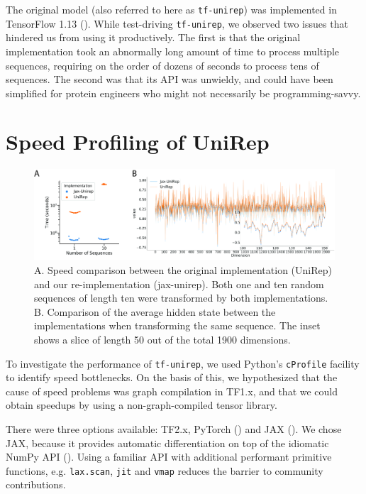 \documentclass{bioinfo}
\begin{document}
The original model (also referred to here as \verb|tf-unirep|)
was implemented in TensorFlow 1.13 (\cite{abadi2016tensorflow}).
While test-driving \verb|tf-unirep|, we observed two issues
that hindered us from using it productively.
The first is that the original implementation
took an abnormally long amount of time to process multiple sequences,
requiring on the order of dozens of seconds to process tens of sequences.
The second was that its API was unwieldy,
and could have been simplified for protein engineers
who might not necessarily be programming-savvy.

\section{Speed Profiling of UniRep}

\begin{figure}[!tpb]
    \centerline{\includegraphics[width=6in]{fig01.jpg}}
    \caption{
        A. Speed comparison between the original implementation (UniRep)
        and our re-implementation (jax-unirep).
        Both one and ten random sequences of length ten
        were transformed by both implementations.
        B. Comparison of the average hidden state between the implementations
        when transforming the same sequence.
        The inset shows a slice of length 50 out of the total 1900 dimensions.
    }
    \label{fig:01}
\end{figure}

To investigate the performance of \verb|tf-unirep|,
we used Python's \verb|cProfile| facility to identify speed bottlenecks.
On the basis of this, we hypothesized that the cause of speed problems
was graph compilation in TF1.x,
and that we could obtain speedups by using
a non-graph-compiled tensor library.

There were three options available: TF2.x, PyTorch (\cite{pytorch})
and JAX (\cite{jax2018github}).
We chose JAX, because it provides automatic differentiation
on top of the idiomatic NumPy API (\cite{oliphant2006guide}).
Using a familiar API with additional performant primitive functions,
e.g. \verb|lax.scan|, \verb|jit| and \verb|vmap|
reduces the barrier to community contributions.
\end{document}
